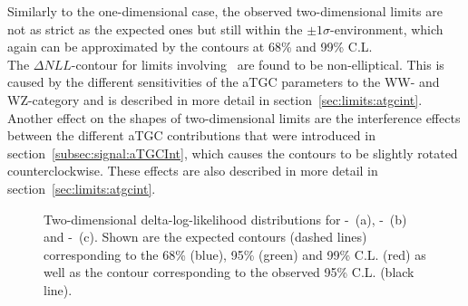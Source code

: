 \noindent Similarly to the one-dimensional case, the observed two-dimensional limits are not as strict as the expected ones but still within the $\pm 1\sigma$-environment, which again can be approximated by the contours at 68\% and 99\% C.L.\\

\noindent The $\Delta NLL$-contour for limits involving \Tcb \ are found to be non-elliptical. This is caused by the different sensitivities of the aTGC parameters to the WW- and WZ-category and is described in more detail in section~\ref{sec:limits:atgcint}. Another effect on the shapes of two-dimensional limits are the interference effects between the different aTGC contributions that were introduced in section~\ref{subsec:signal:aTGCInt}, which causes the contours to be slightly rotated counterclockwise. These effects are also described in more detail in section~\ref{sec:limits:atgcint}.

\begin{figure}
	\centering
	\caption[Two-dimensional delta-log-likelihood distributions for the three combinations of aTGC parameters]{Two-dimensional delta-log-likelihood distributions for \Tcwww -\Tccw \ (a), \Tcwww -\Tcb \ (b) and \Tccw -\Tcb\ (c). Shown are the expected contours (dashed lines) corresponding to the 68\% (blue), 95\% (green) and 99\% C.L. (red) as well as the contour corresponding to the observed 95\% C.L. (black line).}
	\label{fig:limits:2dlimits}	
\end{figure}

